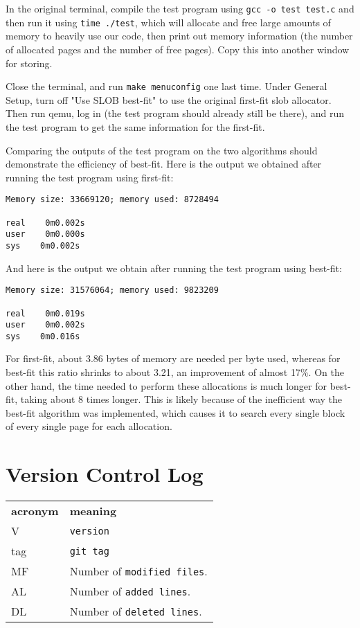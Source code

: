 \documentclass[letterpaper,10pt,titlepage,draftclsnofoot,onecolumn]{article}
\begin{document}
In the original terminal, compile the test program using \verb`gcc -o test test.c` and then run it using \verb`time ./test`, which will allocate and free large amounts of memory to heavily use our code, then print out memory information (the number of allocated pages and the number of free pages). Copy this into another window for storing.

Close the terminal, and run \verb`make menuconfig` one last time. Under General Setup, turn off "Use SLOB best-fit" to use the original first-fit slob allocator. Then run qemu, log in (the test program should already still be there), and run the test program to get the same information for the first-fit.

Comparing the outputs of the test program on the two algorithms should demonstrate the efficiency of best-fit. Here is the output we obtained after running the test program using first-fit:
\begin{verbatim}
Memory size: 33669120; memory used: 8728494

real    0m0.002s
user    0m0.000s
sys    0m0.002s
\end{verbatim}
And here is the output we obtain after running the test program using best-fit:
\begin{verbatim}
Memory size: 31576064; memory used: 9823209

real    0m0.019s
user    0m0.002s
sys    0m0.016s
\end{verbatim}
For first-fit, about 3.86 bytes of memory are needed per byte used, whereas for best-fit this ratio shrinks to about 3.21, an improvement of almost 17\%. On the other hand, the time needed to perform these allocations is much longer for best-fit, taking about 8 times longer. This is likely because of the inefficient way the best-fit algorithm was implemented, which causes it to search every single block of every single page for each allocation.

\section{Version Control Log}
\begin{tabular}{lp{12cm}}
  \label{tabular:legend:git-log}
  \textbf{acronym} & \textbf{meaning} \\
  V & \texttt{version} \\
  tag & \texttt{git tag} \\
  MF & Number of \texttt{modified files}. \\
  AL & Number of \texttt{added lines}. \\
  DL & Number of \texttt{deleted lines}. \\
\end{tabular}
\end{document}
